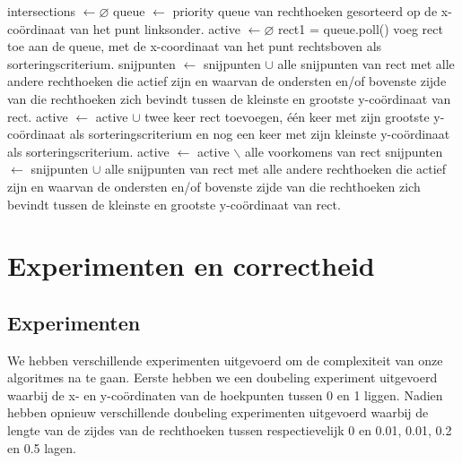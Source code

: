 \documentclass[11pt,a4paper,titlepage]{article}
\begin{document}
		\begin{algorithm}[H]
			\caption{}
			\begin{algorithmic}[1]
				\State intersections $\gets \varnothing $
				\State queue $\gets$ priority queue van rechthoeken gesorteerd op de x-coördinaat van het punt linksonder.
				\State active $\gets \varnothing$
				\State rect1 = queue.poll()
				\State voeg rect toe aan de queue, met de x-coordinaat van het punt rechtsboven als sorteringscriterium.
				\State snijpunten $\gets$ snijpunten $\cup$ alle snijpunten van rect met alle andere rechthoeken die actief zijn en waarvan de ondersten en/of bovenste zijde van die rechthoeken zich bevindt tussen de kleinste en grootste y-coördinaat van rect.
				\State active $\gets$ active $\cup$ twee keer rect toevoegen, één keer met zijn grootste y-coördinaat als sorteringscriterium en nog een keer met zijn kleinste y-coördinaat als sorteringscriterium.
				\Else
				\State active $\gets$ active $\backslash$ alle voorkomens van rect
				\State snijpunten $\gets$ snijpunten $\cup$ alle snijpunten van rect met alle andere rechthoeken die actief zijn en waarvan de ondersten en/of bovenste zijde van die rechthoeken zich bevindt tussen de kleinste en grootste y-coördinaat van rect.
				\EndIf
				\EndWhile
			\end{algorithmic}
		\end{algorithm}
	
	\section{Experimenten en correctheid}
		\subsection{Experimenten}
		We hebben verschillende experimenten uitgevoerd om de complexiteit van onze algoritmes na te gaan. Eerste hebben we een doubeling experiment uitgevoerd waarbij de x- en y-coördinaten van de hoekpunten tussen 0 en 1 liggen.  Nadien hebben opnieuw verschillende doubeling experimenten uitgevoerd waarbij de lengte van de zijdes van de rechthoeken tussen  respectievelijk 0 en 0.01, 0.01, 0.2 en 0.5 lagen.
\end{document}
